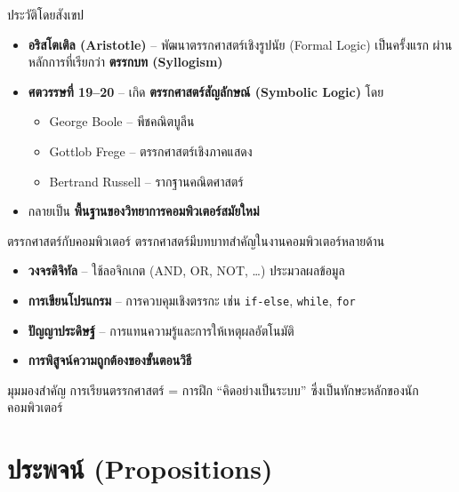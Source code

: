 \begin{frame}{ประวัติโดยสังเขป}
  \begin{itemize}
    \item \textbf{อริสโตเติล (Aristotle)} -- พัฒนาตรรกศาสตร์เชิงรูปนัย (Formal Logic) เป็นครั้งแรก
          ผ่านหลักการที่เรียกว่า \textbf{ตรรกบท (Syllogism)}
    \item \textbf{ศตวรรษที่ 19--20} -- เกิด \textbf{ตรรกศาสตร์สัญลักษณ์ (Symbolic Logic)} โดย
      \begin{itemize}
        \item George Boole -- พีชคณิตบูลีน
        \item Gottlob Frege -- ตรรกศาสตร์เชิงภาคแสดง
        \item Bertrand Russell -- รากฐานคณิตศาสตร์
      \end{itemize}
    \item กลายเป็น \textbf{พื้นฐานของวิทยาการคอมพิวเตอร์สมัยใหม่}
  \end{itemize}
\end{frame}

\begin{frame}{ตรรกศาสตร์กับคอมพิวเตอร์}
  ตรรกศาสตร์มีบทบาทสำคัญในงานคอมพิวเตอร์หลายด้าน
  \begin{itemize}
    \item \textbf{วงจรดิจิทัล}  -- ใช้ลอจิกเกต (AND, OR, NOT, \ldots) ประมวลผลข้อมูล
    \item \textbf{การเขียนโปรแกรม} -- การควบคุมเชิงตรรกะ เช่น \texttt{if-else}, \texttt{while}, \texttt{for}
    \item \textbf{ปัญญาประดิษฐ์}  -- การแทนความรู้และการให้เหตุผลอัตโนมัติ
    \item \textbf{การพิสูจน์ความถูกต้องของขั้นตอนวิธี} 
  \end{itemize}
  \vspace{0.6em}
  \begin{exampleblock}{มุมมองสำคัญ}
    การเรียนตรรกศาสตร์ = การฝึก ``คิดอย่างเป็นระบบ'' ซึ่งเป็นทักษะหลักของนักคอมพิวเตอร์
  \end{exampleblock}
\end{frame}


\section{ประพจน์ (Propositions)}

